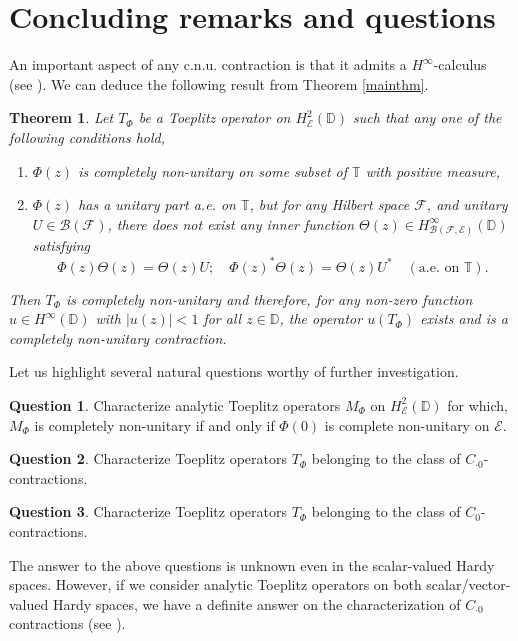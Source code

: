 \documentclass[12pt]{amsart}
\numberwithin{equation}{section}
\newtheorem{thm}[propn]{Theorem}
\theoremstyle{definition}
\newtheorem*{question}{Question}
\newcommand{\D}{\mathbb{D}}
\newcommand{\T}{\mathbb{T}}
\newcommand{\1}{{\mbox{\bf 1}}}
\newcommand{\clb}{\mathcal{B}}
\newcommand{\cle}{\mathcal{E}}
\newcommand{\clf}{\mathcal{F}}
\begin{document}
\section{Concluding remarks and questions}\label{conclusion}
An important aspect of any c.n.u. contraction is that it admits a $H^{\infty}$-calculus (see \cite[Chapter 3]{NF}). We can deduce the following result from Theorem \ref{mainthm}.
\begin{thm}\label{cnu-toep}
Let $T_{\Phi}$ be a Toeplitz operator on $H_{\cle}^2(\D)$ such that any one of the following conditions hold, 
\begin{enumerate}
\item[(I)] $\Phi(z)$ is completely non-unitary on some subset of $\T$ with positive measure,
\item[(II)] $\Phi(z)$ has a unitary part a.e. on $\T$, but for any Hilbert space $\clf$, and unitary $U \in \clb(\clf)$, there does not exist any inner function $\Theta(z) \in H_{\clb(\clf, \cle)}^{\infty}(\D)$ satisfying \[
\Phi(z) \Theta(z) = \Theta(z) U; \quad \Phi(z)^* \Theta(z) = \Theta(z) U^* \quad (\text{a.e.  on } \T).
\]
\end{enumerate}
Then $T_{\Phi}$ is completely non-unitary and therefore, for any non-zero function $u \in H^{\infty}(\D)$ with $|u(z)|< 1$ for all $z \in \D$, the operator $u(T_{\Phi})$ exists and is a completely non-unitary contraction.
\end{thm}
Let us highlight several natural questions worthy of further investigation.

\begin{question}
Characterize analytic Toeplitz operators $M_{\Phi}$ on $H_{\cle}^2(\D)$ for which, $M_{\Phi}$ is completely non-unitary if and only if $\Phi(0)$ is complete non-unitary on $\cle$.
\end{question}

\begin{question}
Characterize Toeplitz operators $T_{\Phi}$ belonging to the class of $C_{\cdot 0}$-contractions.
\end{question}

\begin{question}
Characterize Toeplitz operators $T_{\Phi}$ belonging to the class of $C_{0}$-contractions.
\end{question}

The answer to the above questions is unknown even in the scalar-valued Hardy spaces. However, if we consider analytic Toeplitz operators on both scalar/vector-valued Hardy spaces, we have a definite answer on the characterization of $C_{\cdot 0}$ contractions (see \cite{CIL, Sarkar2}).
\end{document}
